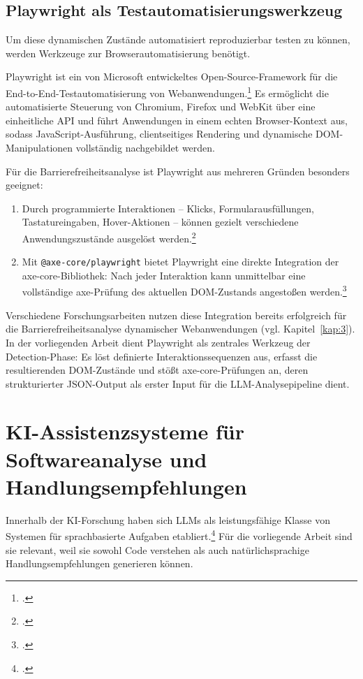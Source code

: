 \subsection{Playwright als Testautomatisierungswerkzeug}

Um diese dynamischen Zustände automatisiert reproduzierbar testen zu können, werden Werkzeuge zur Browserautomatisierung benötigt.

Playwright ist ein von Microsoft entwickeltes Open-Source-Framework für die End-to-End-Test\-automatisierung von Webanwendungen.\footcite[Vgl.][]{playwright} Es ermöglicht die automatisierte Steuerung von Chromium, Firefox und WebKit über eine einheitliche \ac{API} und führt Anwendungen in einem echten Browser-Kontext aus, sodass JavaScript-Ausführung, clientseitiges Rendering und dynamische \ac{DOM}-Manipulationen vollständig nachgebildet werden.

Für die Barrierefreiheitsanalyse ist Playwright aus mehreren Gründen besonders geeignet:
\begin{enumerate}
    \item Durch programmierte Interaktionen -- Klicks, Formularausfüllungen, Tastatureingaben, Hover-Aktionen -- können gezielt verschiedene Anwendungszustände ausgelöst werden.\footcite[Vgl.][]{playwright}
    \item Mit \texttt{@axe-core/playwright} bietet Playwright eine direkte Integration der axe-core-Bibliothek: Nach jeder Interaktion kann unmittelbar eine vollständige axe-Prüfung des aktuellen \ac{DOM}-Zustands angestoßen werden.\footcite[Vgl.][]{axe}
\end{enumerate}

Verschiedene Forschungsarbeiten nutzen diese Integration bereits erfolgreich für die Barrierefreiheitsanalyse dynamischer Webanwendungen (vgl. Kapitel~\ref{kap:3}). In der vorliegenden Arbeit dient Playwright als zentrales Werkzeug der Detection-Phase: Es löst definierte Interaktionssequenzen aus, erfasst die resultierenden \ac{DOM}-Zustände und stößt axe-core-Prüfungen an, deren strukturierter \acs{JSON}-Output als erster Input für die \ac{LLM}-Analysepipeline dient.

\section{\acs{KI}-Assistenzsysteme für Softwareanalyse und Handlungsempfehlungen}\label{kap:2.4}

Innerhalb der \acs{KI}-Forschung haben sich \ac{LLM}s als leistungsfähige Klasse von Systemen für sprachbasierte Aufgaben etabliert.\footcite[Vgl.][S. 22]{russellArtificialIntelligenceModern2021} Für die vorliegende Arbeit sind sie relevant, weil sie sowohl Code verstehen als auch natürlichsprachige Handlungsempfehlungen generieren können.

